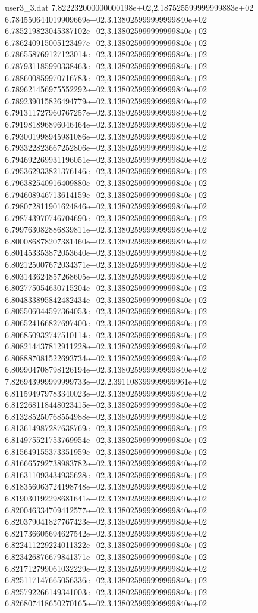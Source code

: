 \begin{filecontents}{user3_3.dat}
7.822232000000000198e+02,2.187525599999999883e+02
6.784550644019909669e+02,3.138025999999999840e+02
6.785219823045387102e+02,3.138025999999999840e+02
6.786240915005123497e+02,3.138025999999999840e+02
6.786558769127123014e+02,3.138025999999999840e+02
6.787931185990338463e+02,3.138025999999999840e+02
6.788600859970716783e+02,3.138025999999999840e+02
6.789621456975552292e+02,3.138025999999999840e+02
6.789239015826494779e+02,3.138025999999999840e+02
6.791311727960767257e+02,3.138025999999999840e+02
6.791981896896046464e+02,3.138025999999999840e+02
6.793001998945981086e+02,3.138025999999999840e+02
6.793322823667252806e+02,3.138025999999999840e+02
6.794692269931196051e+02,3.138025999999999840e+02
6.795362933821376146e+02,3.138025999999999840e+02
6.796382540916409880e+02,3.138025999999999840e+02
6.794608946713614159e+02,3.138025999999999840e+02
6.798072811901624846e+02,3.138025999999999840e+02
6.798743970746704690e+02,3.138025999999999840e+02
6.799763082886839811e+02,3.138025999999999840e+02
6.800086878207381460e+02,3.138025999999999840e+02
6.801453353872053640e+02,3.138025999999999840e+02
6.802125007672034371e+02,3.138025999999999840e+02
6.803143624857268605e+02,3.138025999999999840e+02
6.802775054630715204e+02,3.138025999999999840e+02
6.804833895842482434e+02,3.138025999999999840e+02
6.805506044597364053e+02,3.138025999999999840e+02
6.806524166827697400e+02,3.138025999999999840e+02
6.806850932747510114e+02,3.138025999999999840e+02
6.808214437812911228e+02,3.138025999999999840e+02
6.808887081522693734e+02,3.138025999999999840e+02
6.809904708798126194e+02,3.138025999999999840e+02
7.826943999999999733e+02,2.391108399999999961e+02
6.811594979783340023e+02,3.138025999999999840e+02
6.812268118448023415e+02,3.138025999999999840e+02
6.813285250768554988e+02,3.138025999999999840e+02
6.813614987287638769e+02,3.138025999999999840e+02
6.814975521753769954e+02,3.138025999999999840e+02
6.815649155373351959e+02,3.138025999999999840e+02
6.816665792738983782e+02,3.138025999999999840e+02
6.816311093434935628e+02,3.138025999999999840e+02
6.818356063724198748e+02,3.138025999999999840e+02
6.819030192298681641e+02,3.138025999999999840e+02
6.820046334709412577e+02,3.138025999999999840e+02
6.820379041827767423e+02,3.138025999999999840e+02
6.821736605694627542e+02,3.138025999999999840e+02
6.822411229224011322e+02,3.138025999999999840e+02
6.823426876679841371e+02,3.138025999999999840e+02
6.821712799061032229e+02,3.138025999999999840e+02
6.825117147665056336e+02,3.138025999999999840e+02
6.825792266149341003e+02,3.138025999999999840e+02
6.826807418650270165e+02,3.138025999999999840e+02

\end{filecontents}
